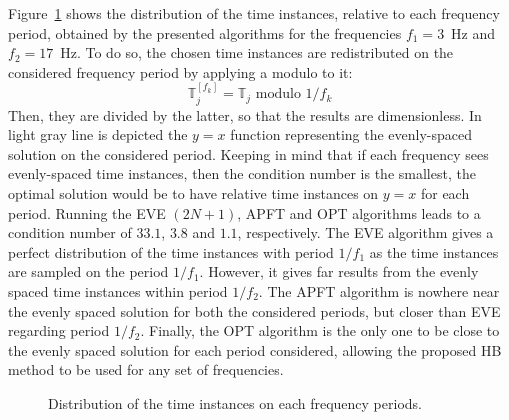 Figure~\ref{fig:distribution_tlv} shows the distribution of the time
instances, relative to each frequency period, obtained by the presented
algorithms for the frequencies $f_1 = 3$~Hz and $f_2 = 17$~Hz. 
To do so, the chosen time instances are redistributed
on the considered frequency period by applying a modulo to it:
\begin{equation}
  \label{eq:1}
  \mathbb{T}^{[f_k]}_j =  \mathbb{T}_j \text{ modulo } 1/f_k
\end{equation}
Then, they are divided by the latter, so that the results are
dimensionless.  In light gray line is depicted the $y=x$ function
representing the evenly-spaced solution on the considered period.
Keeping in mind that if each frequency sees evenly-spaced time instances,
then the condition number is the smallest, the optimal solution would
be to have relative time instances on $y=x$ for each period.  Running the
EVE $(2N + 1)$, APFT and OPT algorithms leads to a condition number of $33.1$,
$3.8$ and $1.1$, respectively.  The EVE algorithm gives a perfect distribution
of the time instances with
period $1/f_1$ as the time instances are sampled on the period
$1/f_1$. However, it gives far results from the evenly spaced time instances
within period $1/f_2$. The APFT algorithm is nowhere near the evenly spaced
solution for both the considered periods, but closer than EVE regarding
period $1/f_2$. Finally, the OPT algorithm is the only one to be close
to the evenly spaced solution for each period considered, allowing 
the proposed HB method to be used for any set of frequencies.
\begin{figure}[htb]
  \centering 
  \caption{Distribution of the time instances on each frequency periods.}
  \label{fig:distribution_tlv}
\end{figure}
